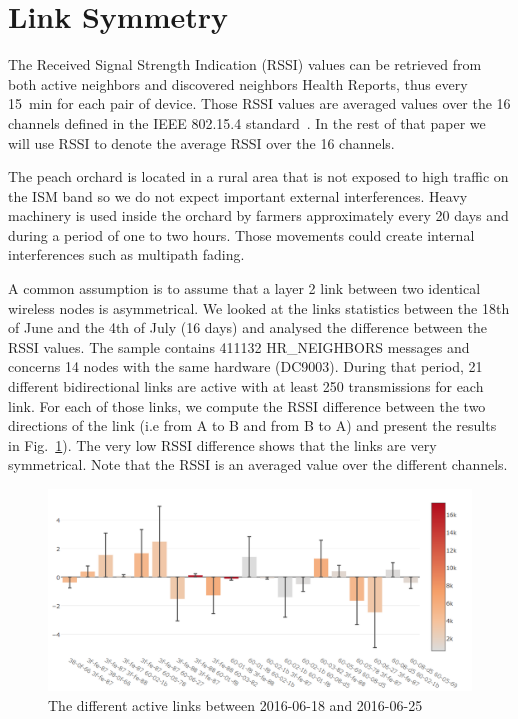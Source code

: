 \documentclass{sig-alternate}
\begin{document}
\section{Link Symmetry}
\label{sec:symmetry}



The Received Signal Strength Indication (RSSI) values can be retrieved from both active neighbors and discovered neighbors Health Reports, thus every 15~min for each pair of device.
Those RSSI values are averaged values over the 16 channels defined in the IEEE 802.15.4 standard~\cite{std_ieee802154_2011}.
In the rest of that paper we will use RSSI to denote the average RSSI over the 16 channels.


The peach orchard is located in a rural area that is not exposed to high traffic on the ISM band so we do not expect important external interferences.
Heavy machinery is used inside the orchard by farmers approximately every 20 days and during a period of one to two hours.
Those movements could create internal interferences such as multipath fading.


A common assumption is to assume that a layer 2 link between two identical wireless nodes is asymmetrical.
We looked at the links statistics between the 18th of June and the 4th of July (16 days) and analysed the difference between the RSSI values.
The sample contains 411132 HR\_NEIGHBORS messages and concerns 14 nodes with the same hardware (DC9003).
During that period, 21 different bidirectional links are active with at least 250 transmissions for each link.
For each of those links, we compute the RSSI difference between the two directions of the link (i.e from A to B and from B to A) and present the results in Fig.~\ref{fig:tab_symmetry}).
The very low RSSI difference shows that the links are very symmetrical.
Note that the RSSI is an averaged value over the different channels.

\begin{figure}
    \centering
    \includegraphics[width=\columnwidth]{sym_plot}
    \caption{The different active links between 2016-06-18 and 2016-06-25}
    \label{fig:tab_symmetry}
\end{figure}
\end{document}
